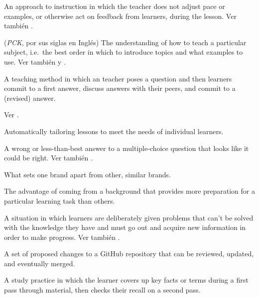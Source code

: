 \begin{description}
 An approach to instruction in which
the teacher does not adjust pace or examples, or otherwise act on feedback from
learners, during the lesson.  Ver también .

 (\emph{PCK}, por sus siglas en Inglés)
The understanding of how to teach a particular subject, i.e.\ the best order in
which to introduce topics and what examples to use. Ver también
y .

 A teaching method in which an
teacher poses a question and then learners commit to a first answer, discuss
answers with their peers, and commit to a (revised) answer.

 Ver .

 Automatically tailoring
lessons to meet the needs of individual learners.

 A wrong or less-than-best
answer to a multiple-choice question that looks like it could be right. Ver también
.

 What sets one brand apart from other,
similar brands.

 The advantage of coming
from a background that provides more preparation for a particular learning task
than others.

 A situation in which learners
are deliberately given problems that can't be solved with the knowledge they
have and must go out and acquire new information in order to make progress.
Ver también .

 A set of proposed changes to a GitHub
repository that can be reviewed, updated, and eventually merged.

 A study practice in which
the learner covers up key facts or terms during a first pass through material,
then checks their recall on a second pass.


\end{description}
